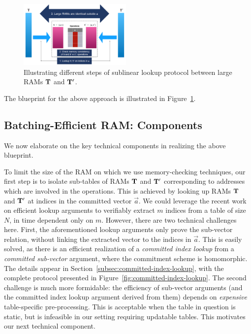 \begin{figure}[htbp]
    \centering
    \includegraphics[width=0.49\textwidth]{RAM-Lookup}
    \caption{Illustrating different steps of sublinear lookup protocol between large RAMs $\mathbf{T}$ and $\mathbf{T}'$.}
    \label{fig:blueprint}
\end{figure}

The blueprint for the above approach is illustrated in Figure~\ref{fig:blueprint}.

\subsection{Batching-Efficient RAM: Components}\label{subsec:batching-efficient-ram-components}
We now elaborate on the key technical components in realizing the above blueprint.

\smallskip

 To limit the size of the RAM on which we use memory-checking techniques,
our first step is to isolate sub-tables of RAMs $\mathbf{T}$ and
$\mathbf{T}'$ corresponding to addresses which are involved in the operations.
This is achieved by looking up RAMs $\mathbf{T}$ and
$\mathbf{T}'$ at indices in the committed vector $\vec{a}$. We could leverage the recent work on efficient lookup
arguments to verifiably extract $m$ indices from a table of size $N$, in time dependent only on $m$.
However, there are two technical challenges here. First, the aforementioned lookup arguments only prove the sub-vector
relation, without linking the extracted vector to the indices in $\vec{a}$. This is easily solved, as there
is an efficient realization of a {\em committed index lookup} from a {\em committed sub-vector} argument,
where the commitment scheme is homomorphic. The details appear in Section~\ref{subsec:committed-index-lookup},
with the complete protocol presented in Figure~\ref{fig:committed-index-lookup}. The second challenge is much more
formidable: the efficiency of sub-vector arguments (and the committed index lookup argument derived from them)
depends on {\em expensive} table-specific pre-processing. This is acceptable when the table in question is
static, but is infeasible in our setting requiring updatable tables. This motivates our next technical
component.

